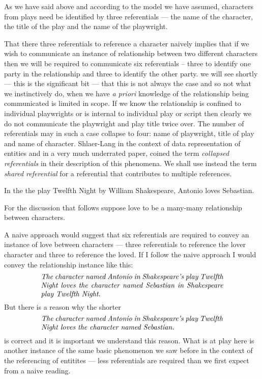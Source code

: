As we have said above and according to the model we have assumed,
  characters from plays need be identified by three referentials
 --- the name of the character, the title of the play and the name of the playwright.

\mynote 
That there three referentials to reference a character naively implies that if we wish to communicate an instance of relationship between two different characters then we will be required to communicate six referentials
 -- three to identify one party in the relationship and three to identify the other party. 
 we will see shortly  --- this is the significant bit --- that this is not always the case and so not what we instinctively do, when we have \textit{a priori} knowledge of the relationship being communicated is limited in scope. 
 If we know the relationship is confined to individual playwrights or is internal to individual play 
 or script then clearly we do not 
  communicate the playwright and play title twice over. The number of referentials may in such a case collapse to four:
   name of playwright, title of play and name of character.
Shlaer-Lang in the context of data representation of entities and in a very much underrated paper, coined the term \textit{collapsed referentials} in
their description of this phenomena.  We shall use instead the term \textit{shared referential} for a referential that contributes to multiple references.

\mynote 
In the  the play Twelfth Night by William Shakespeare, Antonio loves Sebastian.

For the discussion that follows suppose love to be a many-many relationship between characters.

A naive approach would suggest that six referentials are required to convey an instance of love
between characters --- three referentials to reference the lover character and three to reference the loved.
If I follow the naive approach I would convey the relationship instance like this:
\begin{equation}
\text{\parbox{9cm}{\textit{The character named Antonio in Shakespeare's play Twelfth Night loves the character named Sebastian in Shakespeare play Twelfth Night.}}}
\end{equation} 
But there is a reason why the shorter
\begin{equation}
\text{\parbox{9cm}{\textit{The character named Antonio in Shakespeare's play Twelfth Night loves the character named Sebastian.}}}
\end{equation} 
is correct and it is  important we understand this reason.
What is at play here is another instance of the same basic phenomenon we saw before in the context of the referencing of entitites --- less referentials are required than we first expect from a naive reading.  


